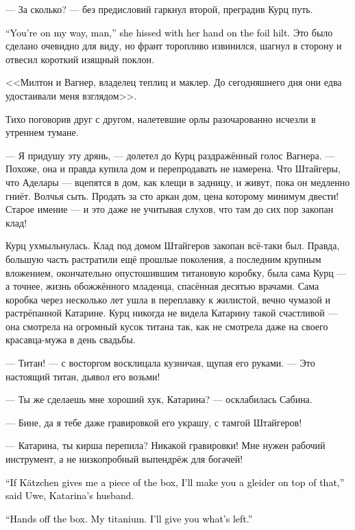 \documentclass[a4paper,10pt,fleqn]{book}\usepackage{polyglossia}\setdefaultlanguage{english}\setotherlanguage{russian}\defaultfontfeatures{Ligatures=TeX,Mapping=tex-text}\usepackage{xcolor}\definecolor{lightgray}{HTML}{bbbbbb}\color{lightgray}\newcommand{\ml}[3]{\textcolor{black}{#3}}
\begin{document}
--- За сколько? --- без предисловий гаркнул второй, преградив Курц путь.

\ml{$0$}
{--- Уйди с дороги, --- процедила она, положив руку на эфес рапиры.}
{``You're on my way, man,'' she hissed with her hand on the foil hilt.}
Это было сделано очевидно для виду, но франт торопливо извинился, шагнул в сторону и отвесил короткий изящный поклон.

<<Милтон и Вагнер, владелец теплиц и маклер.
До сегодняшнего дня они едва удостаивали меня взглядом>>.

Тихо поговорив друг с другом, налетевшие орлы разочарованно исчезли в утреннем тумане.

--- Я придушу эту дрянь, --- долетел до Курц раздражённый голос Вагнера.
--- Похоже, она и правда купила дом и перепродавать не намерена.
Что Штайгеры, что Аделары --- вцепятся в дом, как клещи в задницу, и живут, пока он медленно гниёт.
Волчья сыть.
Продать за сто аркан дом, цена которому минимум двести!
Старое имение --- и это даже не учитывая слухов, что там до сих пор закопан клад!

Курц ухмыльнулась.
Клад под домом Штайгеров закопан всё-таки был.
Правда, большую часть растратили ещё прошлые поколения, а последним крупным вложением, окончательно опустошившим титановую коробку, была сама Курц --- а точнее, жизнь обожжённого младенца, спасённая десятью врачами.
Сама коробка через несколько лет ушла в переплавку к жилистой, вечно чумазой и растрёпанной Катарине.
Курц никогда не видела Катарину такой счастливой --- она смотрела на огромный кусок титана так, как не смотрела даже на своего красавца-мужа в день свадьбы.

--- Титан! --- с восторгом восклицала кузничая, щупая его руками.
--- Это настоящий титан, дьявол его возьми!

--- Ты же сделаешь мне хороший хук, Катарина? --- осклабилась Сабина.

--- Бине, да я тебе даже гравировкой его украшу, с тамгой Штайгеров!

--- Катарина, ты кирша перепила?
Никакой гравировки!
Мне нужен рабочий инструмент, а не низкопробный выпендрёж для богачей!

\ml{$0$}
{--- Если Кэцхен отдаст мне кусок коробки, я и глайдер тебе сделаю, --- с хитрым прищуром влез в разговор Уве, муж Катарины.}
{``If K\"{a}tzchen gives me a piece of the box, I'll make you a gleider on top of that,'' said Uwe, Katarina's husband.}

\ml{$0$}
{--- Так, руки с коробки убрал.}
{``Hands off the box.}
\ml{$0$}
{Мой титан.}
{My titanium.}
\ml{$0$}
{Что останется --- отдам тебе.}
{I'll give you what's left.''}
\end{document}
